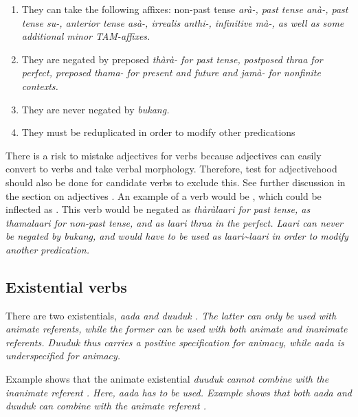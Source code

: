 \begin{enumerate}
\item They can take the following affixes:
	non-past tense \em arà-\em,
	past tense \em anà-\em,
	past tense \em su-\em,
	anterior tense \em asà-\em,
	irrealis \em anthi-\em,
	infinitive \em mà-\em, as well as some additional minor TAM-affixes.
\item They are negated by preposed \em thàrà- \em for past tense, postposed \em thraa \em for perfect,  preposed \em thama- \em for present and future and \em jamà- \em for nonfinite contexts.
\item They are never negated by \em bukang\em.
\item They must be reduplicated in order to modify other predications
\end{enumerate}

There is a risk to mistake adjectives for verbs because adjectives can easily convert to verbs and take verbal morphology. Therefore, test for adjectivehood should also be done for candidate verbs to exclude this. See further discussion in the section on adjectives . An example of a verb would be , which could be inflected as . This verb would be negated as \em thàràlaari \em for past tense, as \em thamalaari \em for non-past tense, and as \em laari thraa \em in the perfect. \em Laari  \em can never be negated by \em bukang\em, and would have to be used as \em laari\~{}laari \em in order to modify another predication.



\subsection{Existential verbs}\label{sec:wc:Existentialverbs:intro}
There are two existentials,  \em aada \em {} and \em duuduk \em {}. The latter can only be used with animate referents, while the former  can be used with both animate and inanimate referents. \em Duuduk \em thus carries a positive specification for animacy, while \em aada \em is underspecified for animacy.

Example  shows that the animate existential \em duuduk \em cannot combine with the inanimate referent . Here, \em aada \em has to be used. Example  shows that both \em aada \em and \em duuduk \em can combine with the animate referent .

